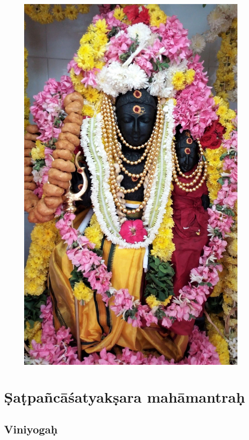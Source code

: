 \documentclass[12pt,oneside,a4paper]{article}
\begin{document}
\begin{figure}[ht]
  \includegraphics{svarnakarsana-bhairava.jpg}
\end{figure}
\clearpage

\section{Ṣaṭpañcāśatyakṣara mahāmantraḥ}
\subsection{Viniyogaḥ}
\end{document}
